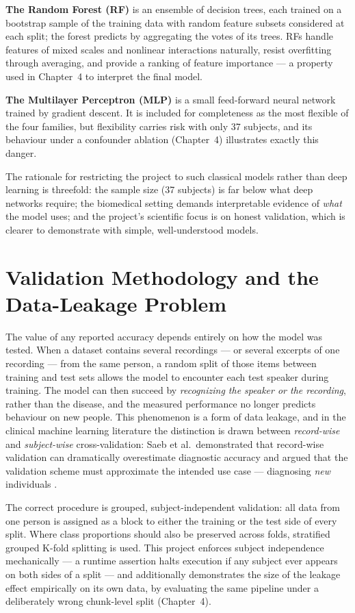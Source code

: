 \textbf{The Random Forest (RF)} \cite{breiman2001} is an ensemble of
decision trees, each trained on a bootstrap sample of the training data
with random feature subsets considered at each split; the forest
predicts by aggregating the votes of its trees. RFs handle features of
mixed scales and nonlinear interactions naturally, resist overfitting
through averaging, and provide a ranking of feature importance ---
a property used in Chapter~4 to interpret the final model.

\textbf{The Multilayer Perceptron (MLP)} is a small feed-forward neural
network trained by gradient descent. It is included for completeness as
the most flexible of the four families, but flexibility carries risk
with only 37 subjects, and its behaviour under a confounder ablation
(Chapter~4) illustrates exactly this danger.

The rationale for restricting the project to such classical models
rather than deep learning is threefold: the sample size (37 subjects)
is far below what deep networks require; the biomedical setting demands
interpretable evidence of \emph{what} the model uses; and the project's
scientific focus is on honest validation, which is clearer to
demonstrate with simple, well-understood models.

\section{Validation Methodology and the Data-Leakage Problem}

The value of any reported accuracy depends entirely on how the model
was tested. When a dataset contains several recordings --- or several
excerpts of one recording --- from the same person, a random split of
those items between training and test sets allows the model to
encounter each test speaker during training. The model can then succeed
by \emph{recognizing the speaker or the recording}, rather than the
disease, and the measured performance no longer predicts behaviour on
new people. This phenomenon is a form of data leakage, and in the
clinical machine learning literature the distinction is drawn between
\emph{record-wise} and \emph{subject-wise} cross-validation: Saeb et
al.\ demonstrated that record-wise validation can dramatically
overestimate diagnostic accuracy and argued that the validation scheme
must approximate the intended use case --- diagnosing \emph{new}
individuals \cite{saeb2017}.

The correct procedure is grouped, subject-independent validation: all
data from one person is assigned as a block to either the training or
the test side of every split. Where class proportions should also be
preserved across folds, stratified grouped K-fold splitting is used.
This project enforces subject independence mechanically --- a runtime
assertion halts execution if any subject ever appears on both sides of
a split --- and additionally demonstrates the size of the leakage
effect empirically on its own data, by evaluating the same pipeline
under a deliberately wrong chunk-level split (Chapter~4).

